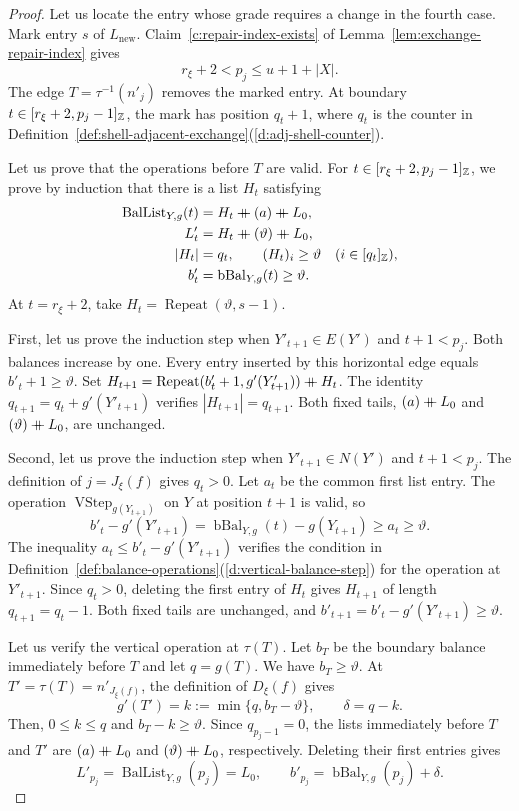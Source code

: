 \begin{proof}
Let us locate the entry whose grade requires a change in the fourth case.
Mark entry $s$ of $L_{\mathrm{new}}$.
Claim~\ref{c:repair-index-exists} of Lemma~\ref{lem:exchange-repair-index} gives
\[
 r_\xi+2<p_j\le u+1+|X|.
\]
The edge $T=\tau^{-1}(n'_j)$ removes the marked entry.
At boundary $t\in[r_\xi+2,p_j-1]_{\mathbb Z}$, the mark has position $q_t+1$, where $q_t$ is the counter in Definition~\ref{def:shell-adjacent-exchange}(\ref{d:adj-shell-counter}).

Let us prove that the operations before $T$ are valid.
For $t\in[r_\xi+2,p_j-1]_{\mathbb Z}$, we prove by induction that there is a list $H_t$ satisfying
\[
\begin{aligned}
 \operatorname{BalList}_{Y,g}(t)&=H_t\ccn(a)\ccn L_0,\\
 L'_t&=H_t\ccn(\vartheta)\ccn L_0,\\
 |H_t|&=q_t,\qquad (H_t)_i\ge\vartheta\quad(i\in[q_t]_{\Z}),\\
 b'_t&=\operatorname{bBal}_{Y,g}(t)\ge\vartheta.
\end{aligned}
\]
At $t=r_\xi+2$, take $H_t=\operatorname{Repeat}(\vartheta,s-1)$.

First, let us prove the induction step when $Y'_{t+1}\in E(Y')$ and $t+1<p_j$.
Both balances increase by one.
Every entry inserted by this horizontal edge equals $b'_t+1\ge\vartheta$.
Set $H_{t+1}=\operatorname{Repeat}(b'_t+1,g'(Y'_{t+1}))\mathbin{+\mkern-10mu+} H_t$.
The identity $q_{t+1}=q_t+g'(Y'_{t+1})$ verifies $|H_{t+1}|=q_{t+1}$.
Both fixed tails, $(a)\mathbin{+\mkern-10mu+} L_0$ and $(\vartheta)\mathbin{+\mkern-10mu+} L_0$, are unchanged.

Second, let us prove the induction step when $Y'_{t+1}\in N(Y')$ and $t+1<p_j$.
The definition of $j=J_\xi(f)$ gives $q_t>0$.
Let $a_t$ be the common first list entry.
The operation $\operatorname{VStep}_{g(Y_{t+1})}$ on $Y$ at position $t+1$ is valid, so
\[
 b'_t-g'(Y'_{t+1})
 =\operatorname{bBal}_{Y,g}(t)-g(Y_{t+1})
 \ge a_t\ge\vartheta.
\]
The inequality $a_t\le b'_t-g'(Y'_{t+1})$ verifies the condition in Definition~\ref{def:balance-operations}(\ref{d:vertical-balance-step}) for the operation at $Y'_{t+1}$.
Since $q_t>0$, deleting the first entry of $H_t$ gives $H_{t+1}$ of length $q_{t+1}=q_t-1$.
Both fixed tails are unchanged, and $b'_{t+1}=b'_t-g'(Y'_{t+1})\ge\vartheta$.

Let us verify the vertical operation at $\tau(T)$.
Let $b_T$ be the boundary balance immediately before $T$ and let $q=g(T)$.
We have $b_T\ge\vartheta$.
At $T'=\tau(T)=n'_{J_\xi(f)}$, the definition of $D_\xi(f)$ gives
\[
 g'(T')=k:=\min\{q,b_T-\vartheta\},\qquad \delta=q-k.
\]
Then, $0\le k\le q$ and $b_T-k\ge\vartheta$.
Since $q_{p_j-1}=0$, the lists immediately before $T$ and $T'$ are $(a)\mathbin{+\mkern-10mu+} L_0$ and $(\vartheta)\mathbin{+\mkern-10mu+} L_0$, respectively.
Deleting their first entries gives
\[
 L'_{p_j}=\operatorname{BalList}_{Y,g}(p_j)=L_0,\qquad
 b'_{p_j}=\operatorname{bBal}_{Y,g}(p_j)+\delta.
\]


\end{proof}
